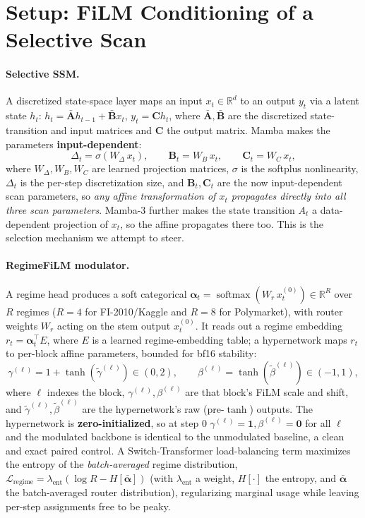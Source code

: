 \documentclass{article}
\newcommand{\R}{\mathbb{R}}
\DeclareMathOperator{\softmaxop}{softmax}
\newcommand{\softmax}{\softmaxop}
\begin{document}
\section{Setup: FiLM Conditioning of a Selective Scan}\label{sec:setup}

\paragraph{Selective SSM.}
A discretized state-space layer maps an input $x_t\in\R^{d}$ to an output $y_t$ via a latent state
$h_t$: $h_t=\bar{\mathbf{A}}h_{t-1}+\bar{\mathbf{B}}x_t$, $y_t=\mathbf{C}h_t$, where
$\bar{\mathbf{A}},\bar{\mathbf{B}}$ are the discretized state-transition and input matrices and $\mathbf{C}$ the output matrix.
Mamba makes the parameters \textbf{input-dependent}:
\begin{equation}\label{eq:selection}
\Delta_t=\sigma(W_\Delta\,x_t),\qquad \mathbf{B}_t=W_B\,x_t,\qquad
\mathbf{C}_t=W_C\,x_t,
\end{equation}
where $W_\Delta,W_B,W_C$ are learned projection matrices, $\sigma$ is the softplus nonlinearity, $\Delta_t$ is the per-step discretization size, and $\mathbf{B}_t,\mathbf{C}_t$ are the now input-dependent scan parameters, so \emph{any affine transformation of $x_t$ propagates directly into all three
scan parameters}. Mamba-3 further makes the state transition $A_t$ a data-dependent projection of $x_t$, so the affine propagates there too. This is the selection mechanism we attempt to steer.

\paragraph{RegimeFiLM modulator.}
A regime head produces a soft categorical
$\bm{\alpha}_t=\softmax(W_r\,x_t^{(0)})\in\R^R$ over $R$ regimes
($R=4$ for FI-2010/Kaggle and $R=8$ for Polymarket), with router weights $W_r$
acting on the stem output $x_t^{(0)}$. It reads out a regime embedding
$r_t=\bm{\alpha}_t^\top E$, where $E$ is a learned regime-embedding table; a hypernetwork maps
$r_t$ to per-block affine parameters, bounded for bf16 stability:
\begin{equation}
\gamma^{(\ell)}=1+\tanh(\tilde{\gamma}^{(\ell)})\in(0,2),\qquad
\beta^{(\ell)}=\tanh(\tilde{\beta}^{(\ell)})\in(-1,1),
\end{equation}
where $\ell$ indexes the block, $\gamma^{(\ell)},\beta^{(\ell)}$ are that block's FiLM scale and shift, and $\tilde{\gamma}^{(\ell)},\tilde{\beta}^{(\ell)}$ are the hypernetwork's raw (pre-$\tanh$) outputs.
The hypernetwork is \textbf{zero-initialized}, so at step 0
$\gamma^{(\ell)}=\mathbf{1},\beta^{(\ell)}=\mathbf{0}$ for all $\ell$ and the
modulated backbone is identical to the unmodulated baseline, a clean and exact
paired control. A Switch-Transformer load-balancing term \citep{fedus2022switch}
maximizes the entropy of the \emph{batch-averaged} regime distribution,
$\mathcal{L}_{\text{regime}}=\lambda_{\text{ent}}(\log R-H[\bar{\bm{\alpha}}])$ (with $\lambda_{\text{ent}}$ a weight, $H[\cdot]$ the entropy, and $\bar{\bm{\alpha}}$ the batch-averaged router distribution),
regularizing marginal usage while leaving per-step assignments free to be peaky.
\end{document}
